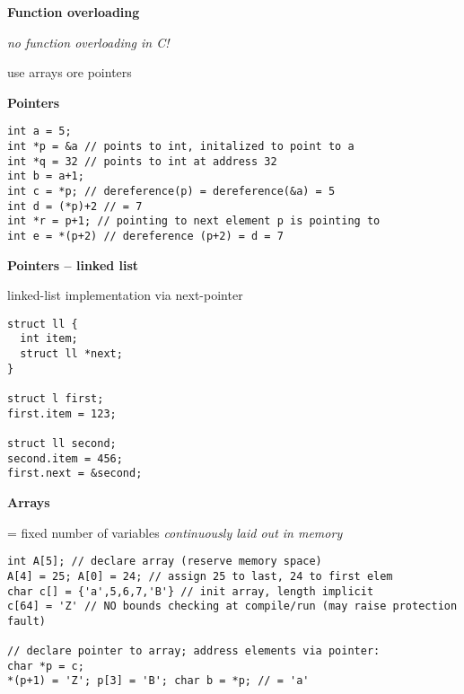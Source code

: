 \textbf{Function overloading}
\begin{items}
  \item \emph{no function overloading in C!}
  \item use arrays ore pointers
\end{items}

\textbf{Pointers}
\begin{lstlisting}[style=customc]
int a = 5;
int *p = &a // points to int, initalized to point to a
int *q = 32 // points to int at address 32
int b = a+1;
int c = *p; // dereference(p) = dereference(&a) = 5
int d = (*p)+2 // = 7
int *r = p+1; // pointing to next element p is pointing to
int e = *(p+2) // dereference (p+2) = d = 7
\end{lstlisting}

\textbf{Pointers -- linked list}
\begin{items}
  \item linked-list implementation via next-pointer
\end{items}
\begin{lstlisting}[style=customc]
struct ll {
  int item;
  struct ll *next;
}

struct l first;
first.item = 123;

struct ll second;
second.item = 456;
first.next = &second;
\end{lstlisting}

\newpage

\textbf{Arrays}
\begin{items}
  \item = fixed number of variables \emph{continuously laid out in memory}
\end{items}
\begin{lstlisting}[style=customc]
int A[5]; // declare array (reserve memory space)
A[4] = 25; A[0] = 24; // assign 25 to last, 24 to first elem
char c[] = {'a',5,6,7,'B'} // init array, length implicit
c[64] = 'Z' // NO bounds checking at compile/run (may raise protection fault)

// declare pointer to array; address elements via pointer:
char *p = c;
*(p+1) = 'Z'; p[3] = 'B'; char b = *p; // = 'a'
\end{lstlisting}

